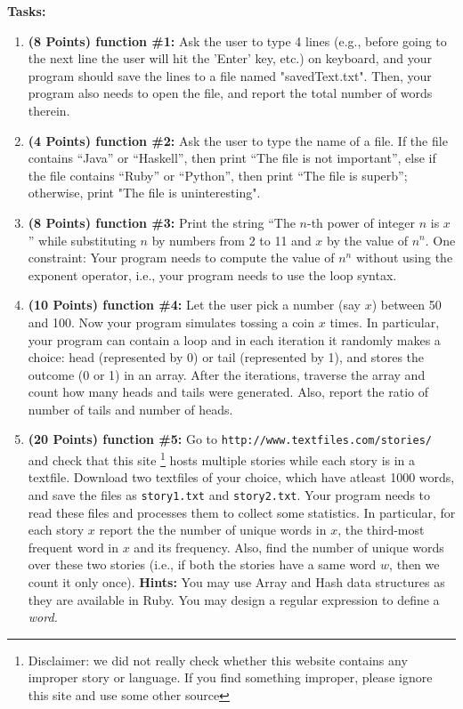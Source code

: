 \documentclass[paper=letter, fontsize=11pt]{scrartcl} %
\begin{document}
    \textbf{Tasks:}
    \begin{enumerate}[noitemsep]

        \item \textbf{(8 Points) function \#1:} Ask the user to type 4 lines (e.g., before going to the next line the user will hit the 'Enter' key, etc.) 
on keyboard, and your program should save the lines to a file named "savedText.txt". Then, your program also needs to open the file, and report the total number of words therein.
        \item \textbf{(4 Points) function \#2:} Ask the user to type the name of a file. If the file contains ``Java'' or ``Haskell'', 
then print ``The file is not important'', else if the file contains ``Ruby'' or ``Python'', then print ``The file is superb''; otherwise, print "The file is uninteresting". 
        \item \textbf{(8 Points) function \#3:} Print the string ``The $n$-th power of integer $n$ is $x$'' while substituting $n$ 
by numbers from 2 to 11 and $x$ by the value of $n^n$. One constraint: Your program needs to compute the value of $n^n$ without using the exponent operator, i.e., your program needs to use the loop syntax.
        \item \textbf{(10 Points) function \#4:} Let the user pick a number (say $x$) between 50 and 100. 
Now your program simulates tossing a coin $x$ times. 
In particular, your program can contain a loop and in each iteration it randomly makes a choice: 
head (represented by 0) or 
tail (represented by 1), and stores the outcome (0 or 1) 
in an array. After the iterations, traverse the array and count how many heads and tails were generated. 
Also, report the ratio of number of tails and number of heads.

        \item \textbf{(20 Points) function \#5:} Go to \texttt{http://www.textfiles.com/stories/} and check that this site 
\footnote {Disclaimer: we did not really check whether this website contains any improper story or language. 
If you find something improper, please ignore this site and use some other source} hosts multiple stories 
while each story is in a textfile. Download two textfiles of your choice, which have atleast 1000 words, 
and save the files as \texttt{story1.txt} and \texttt{story2.txt}. Your program needs to read these files and processes 
them to collect some statistics. In particular, for each story $x$ report the the number of unique words in $x$, 
the third-most frequent word in $x$ and its frequency. Also, find the number of unique words over these two stories 
(i.e., if both the stories have a same word $w$, then we count it only once). 
\textbf {Hints:} You may use Array and Hash data structures as they are available in Ruby. You may design a regular expression to define a \em{word}.  

    \end{enumerate}
 
\end{document}
